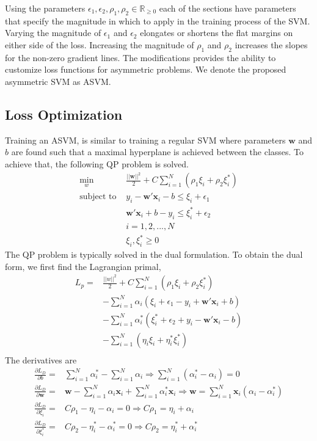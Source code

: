 \documentclass[twoside,11pt]{article}
\begin{document}
Using the parameters $\epsilon_1, \epsilon_2, \rho_1, \rho_2 \in\mathbb{R}_{\geq0}$ each of the sections have parameters that specify the magnitude in which to apply in the training process of the SVM. Varying the magnitude of $\epsilon_1$ and $\epsilon_2$ elongates or shortens the flat margins on either side of the loss. Increasing the magnitude of $\rho_1$ and $\rho_2$ increases the slopes for the non-zero gradient lines. The modifications provides the ability to customize loss functions for asymmetric problems. We denote the proposed asymmetric SVM as ASVM.

\subsection{Loss Optimization}
Training an ASVM, is similar to training a regular SVM where parameters $\mathbf{w}$ and $b$ are found such that a maximal hyperplane is achieved between the classes. To achieve that, the following QP problem is solved.
\begin{equation} \label{Eq:QuantileSVMa}
\begin{array}{cc}
\displaystyle\min_w& \frac{||\mathbf{w}||^2}{2}+C\displaystyle\sum_{i=1}^N(\rho_1\xi_i + \rho_2\xi_i^*) \\
\text{subject to    } & y_i - \mathbf{w}'\mathbf{x}_i - b \leq \xi_i + \epsilon_1 \\
 & \mathbf{w}'\mathbf{x}_i + b -y_i \leq \xi_i^* + \epsilon_2 \\
&i=1,2,...,N\\
&\xi_i,\xi_i^* \geq 0
\end{array}
\end{equation}
The QP problem is typically solved in the dual formulation. To obtain the dual form, we first find the Lagrangian primal,
\[
\begin{array}{cc}
L_p=&\frac{||w||^2}{2}+C\displaystyle\sum_{i=1}^N(\rho_1\xi_i + \rho_2\xi_i^*) \\
& - \displaystyle\sum_{i=1}^N \alpha_i(\xi_i + \epsilon_1 - y_i + \mathbf{w}'\mathbf{x}_i + b)\\
& - \displaystyle\sum_{i=1}^N \alpha_i^*(\xi_i^* + \epsilon_2 + y_i - \mathbf{w}'\mathbf{x}_i - b)\\
&-\displaystyle\sum_{i=1}^N (\eta_i \xi_i + \eta_i^* \xi_i^*)\\
\end{array}
\]
The derivatives are
\[
\begin{array}{cc}
\frac{\partial L_D}{\partial b} = &\displaystyle\sum_{i=1}^N \alpha_i^*  - \displaystyle\sum_{i=1}^N \alpha_i \Rightarrow \displaystyle\sum_{i=1}^N (\alpha_i^* - \alpha_i) = 0 \\
\frac{\partial L_D}{\partial \mathbf{w}} = & \mathbf{w}-\displaystyle\sum_{i=1}^N \alpha_i \mathbf{x}_i+\displaystyle\sum_{i=1}^N \alpha_i^* \mathbf{x}_i \Rightarrow \mathbf{w} = \displaystyle\sum_{i=1}^N \mathbf{x}_i (\alpha_i - \alpha_i^*)\\
\frac{\partial L_D}{\partial \xi_i} = & C\rho_1 - \eta_i -\alpha_i = 0 \Rightarrow  C\rho_1 = \eta_i + \alpha_i \\
\frac{\partial L_D}{\partial \xi_i^*} = &C\rho_2 - \eta_i^* -\alpha_i^* = 0 \Rightarrow  C\rho_2 = \eta_i^* + \alpha_i^*
\end{array}
\]
\end{document}
